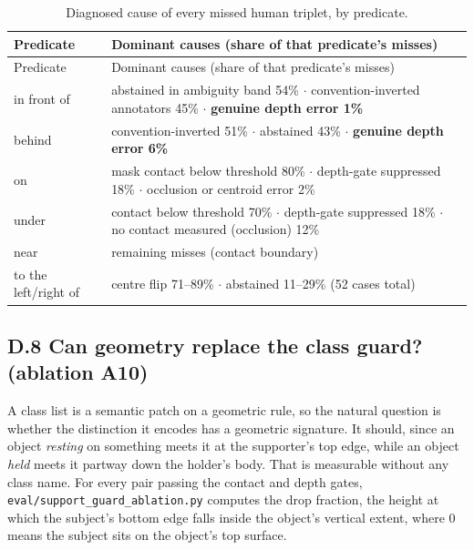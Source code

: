 \begin{center}
\setlength{\tabcolsep}{3pt}
\footnotesize
\begin{longtable}{>{\raggedright\arraybackslash}p{}>{\raggedright\arraybackslash}p{}}
\caption{Diagnosed cause of every missed human triplet, by predicate.}\\
\hline
Predicate & Dominant causes (share of that predicate's misses) \\
\hline
\endfirsthead
\hline
Predicate & Dominant causes (share of that predicate's misses) \\
\hline
\endhead
in front of & abstained in ambiguity band 54\% $\cdot$ convention-inverted annotators 45\% $\cdot$ \textbf{genuine depth error 1\%} \\
behind & convention-inverted 51\% $\cdot$ abstained 43\% $\cdot$ \textbf{genuine depth error 6\%} \\
on & mask contact below threshold 80\% $\cdot$ depth-gate suppressed 18\% $\cdot$ occlusion or centroid error 2\% \\
under & contact below threshold 70\% $\cdot$ depth-gate suppressed 18\% $\cdot$ no contact measured (occlusion) 12\% \\
near & 2 remaining misses (contact boundary) \\
to the left/right of & centre flip 71--89\% $\cdot$ abstained 11--29\% (52 cases total) \\
\hline
\end{longtable}
\end{center}

\subsection{D.8 Can geometry replace the class guard? (ablation A10)}

A class list is a semantic patch on a geometric rule, so the natural question is whether the distinction it encodes has a geometric signature. It should, since an object \textit{resting} on something meets it at the supporter's top edge, while an object \textit{held} meets it partway down the holder's body. That is measurable without any class name. For every pair passing the contact and depth gates, \texttt{eval/support\_\allowbreak{}guard\_\allowbreak{}ablation.py} computes the drop fraction, the height at which the subject's bottom edge falls inside the object's vertical extent, where 0 means the subject sits on the object's top surface.

